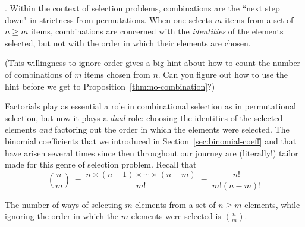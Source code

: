 
\medskip

.
Within the context of selection problems, combinations are the ``next step down" in strictness from permutations.  When one selects $m$ items from a set of $n \geq m$ items, combinations are concerned with the {\em identities} of the elements selected, but not with the order in which their elements are chosen.

\smallskip

\noindent (This willingness to ignore order gives a big hint about how to count the number of
combinations of $m$ items chosen from $n$.  Can you figure out how to use the hint before
we get to Proposition~\ref{thm:no-combination}?)

\medskip

Factorials play as essential a role in combinational selection as in permutational selection, but
now it plays a {\em dual} role: choosing the identities of the selected elements {\em and} factoring out the order in which the elements were selected.  The binomial coefficients that we introduced in Section~\ref{sec:binomial-coeff} and that have arisen several times since then
throughout our journey are (literally!) tailor made for this genre of selection problem.  Recall that
\[ {n \choose m} \ = \ \frac{n \times (n-1) \times \cdots \times (n-m)}{m!} \ = \  \frac{n!}{m!(n-m)!} 
\]

\begin{prop}
\label{thm:no-combination}
The number of ways of selecting $m$ elements from a set of $n \geq m$ elements, while ignoring the order in which the $m$ elements were selected is $\displaystyle {n \choose m}$.
\end{prop}

